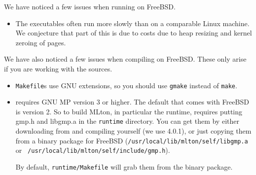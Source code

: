 
We have noticed a few issues when running {\mlton} on FreeBSD.  

\begin{itemize}

\item The executables often run more slowly than on a comparable Linux machine.
We conjecture that part of this is due to costs due to heap resizing and kernel
zeroing of pages.

\end{itemize}

We have also noticed a few issues when compiling {\mlton} on FreeBSD.  These
only arise if you are working with the {\mlton} sources.

\begin{itemize}

\item {\mlton} {\tt Makefile}s use GNU extensions, so you should use {\tt gmake}
instead of {\tt make}.

\item {\mlton} requires GNU MP version 3 or higher.  The default that comes with
FreeBSD is version 2.  So to build MLton, in particular the runtime, requires
putting gmp.h and libgmp.a in the {\tt runtime} directory.  You can get them
by either downloading from 
and compiling yourself (we use 4.0.1), or just copying them from a {\mlton}
binary package for FreeBSD ({\tt /usr/local/lib/mlton/self/libgmp.a} or {\tt
/usr/local/lib/mlton/self/include/gmp.h}).

By default, {\tt runtime/Makefile} will grab them from the {\mlton} binary
package.

\end{itemize}
